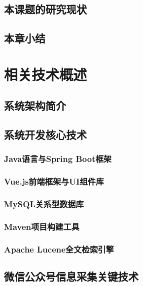 \documentclass[a4paper,12pt]{ctexart}
\newcommand{\wuhao}{\fontsize{10.5pt}{15.75pt}\selectfont} %
\begin{document}
\subsection{本课题的研究现状}
\songti\wuhao
[此处添加研究现状内容]

\subsection{本章小结}
\songti\wuhao
[此处添加本章小结内容]

\section{相关技术概述}

\subsection{系统架构简介}

\subsection{系统开发核心技术}

\subsubsection{Java语言与Spring Boot框架}

\subsubsection{Vue.js前端框架与UI组件库}

\subsubsection{MySQL关系型数据库}

\subsubsection{Maven项目构建工具}

\subsubsection{Apache Lucene全文检索引擎}

\subsection{微信公众号信息采集关键技术}
\end{document}
